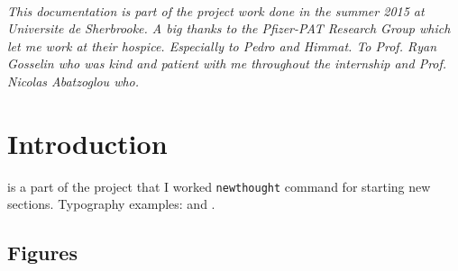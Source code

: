 \documentclass{tufte-book} %
\begin{document}
\listoftables %


\cleardoublepage
~\vfill
\begin{doublespace}
\noindent\fontsize{18}{22}\selectfont\itshape
\nohyphenation
This documentation is part of the project work done in the summer 2015 at Universite de Sherbrooke. A big thanks to the Pfizer-PAT Research Group which let me work at their hospice. Especially to Pedro and Himmat. To Prof. Ryan Gosselin who was kind and patient with me throughout the internship and Prof. Nicolas Abatzoglou who.
\end{doublespace}
\vfill
\vfill


\cleardoublepage
\chapter{Introduction} %
\label{ch:0}

 is a part of the project that I worked \texttt{newthought} command for starting new sections. Typography examples:  and .


\section{Figures}

\lipsum[1] 
\end{document}
